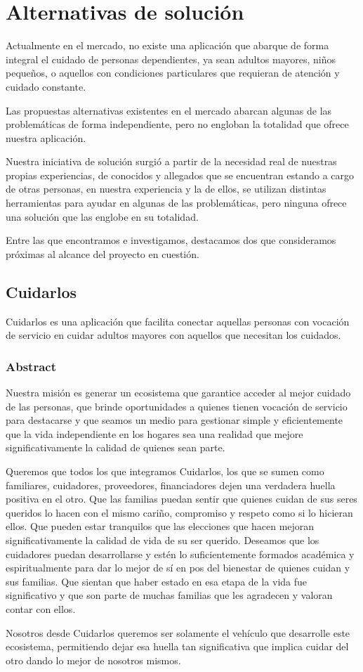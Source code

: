 \documentclass[a4paper,12pt]{article}
\begin{document}
    \section{Alternativas de solución}
    \par Actualmente en el mercado, no existe una aplicación que abarque de forma integral el cuidado de personas dependientes, ya sean adultos mayores, niños pequeños, o aquellos con condiciones particulares que requieran de atención y cuidado constante.
    \par Las propuestas alternativas existentes en el mercado abarcan algunas de las problemáticas de forma independiente, pero no engloban la totalidad que ofrece nuestra aplicación.
    \par Nuestra iniciativa de solución surgió a partir de la necesidad real de nuestras propias experiencias, de conocidos y allegados que se encuentran estando a cargo de otras personas, en nuestra experiencia y la de ellos, se utilizan distintas herramientas para ayudar en algunas de las problemáticas, pero ninguna ofrece una solución que las englobe en su totalidad.
    \par Entre las que encontramos e investigamos, destacamos dos que consideramos próximas al alcance del proyecto en cuestión.
    \subsection{Cuidarlos}
    \par Cuidarlos es una aplicación que facilita conectar aquellas personas con vocación de servicio en cuidar adultos mayores con aquellos que necesitan los cuidados.
    \subsubsection{Abstract}
    \par Nuestra misión es generar un ecosistema que garantice acceder al mejor cuidado de las personas, que brinde oportunidades a quienes tienen vocación de servicio para destacarse y que seamos un medio para gestionar simple y eficientemente que la vida independiente en los hogares sea una realidad que mejore significativamente la calidad de quienes sean parte.
    \par Queremos que todos los que integramos Cuidarlos, los que se sumen como familiares, cuidadores, proveedores, financiadores dejen una verdadera huella positiva en el otro. Que las familias puedan sentir que quienes cuidan de sus seres queridos lo hacen con el mismo cariño, compromiso y respeto como si lo hicieran ellos. Que pueden estar tranquilos que las elecciones que hacen mejoran significativamente la calidad de vida de su ser querido. Deseamos que los cuidadores puedan desarrollarse y estén lo suficientemente formados académica y espiritualmente para dar lo mejor de sí en pos del bienestar de quienes cuidan y sus familias. Que sientan que haber estado en esa etapa de la vida fue significativo y que son parte de muchas familias que les agradecen y valoran contar con ellos.
    \par Nosotros desde Cuidarlos queremos ser solamente el vehículo que desarrolle este ecosistema, permitiendo dejar esa huella tan significativa que implica cuidar del otro dando lo mejor de nosotros mismos.\cite{Cuidarlos}
\end{document}

